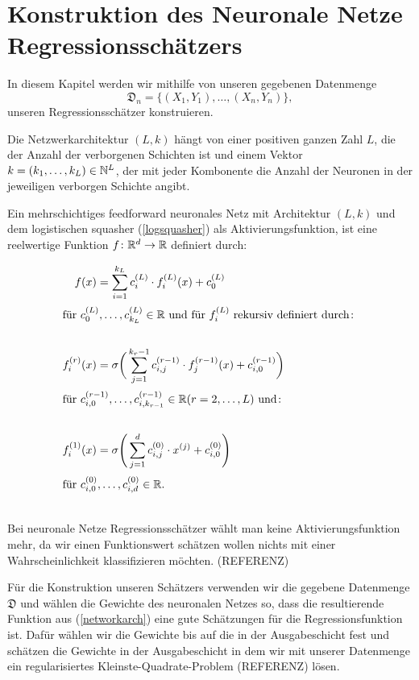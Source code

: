\chapter{Konstruktion des Neuronale Netze Regressionsschätzers}
\label{chap:2}

In diesem Kapitel werden wir mithilfe von unseren gegebenen Datenmenge 
$$ \mathfrak{D}_n = \{(X_1, Y_1),\dots,(X_n, Y_n)\},$$
unseren Regressionsschätzer konstruieren. 

Die Netzwerkarchitektur $(L, k)$ hängt von einer positiven ganzen Zahl $L$, die der Anzahl der verborgenen Schichten ist und einem Vektor $k = (k_1,\dots,k_L) \in \mathbb{N}^L$, der mit jeder Kombonente die Anzahl der Neuronen in der jeweiligen verborgen Schichte angibt. 

Ein mehrschichtiges feedforward neuronales Netz mit Architektur $(L, k)$ und dem logistischen squasher (\ref{logsquasher}) als Aktivierungsfunktion, ist eine reelwertige Funktion $f\colon \mathbb{R}^d \to \mathbb{R}$ definiert durch$\colon$

\begin{align}
\label{networkarch}
f(x) & = \sum_{i = 1}^{k_L} c_i^{(L)} \cdot f_i^{(L)}(x) + c_0^{(L)} \nonumber \\
\intertext{für $c_0^{(L)},\dots,c_{k_L}^{(L)} \in \mathbb{R}$ und für $f_i^{(L)}$ rekursiv definiert durch$\colon$} \nonumber \\
f_i^{(r)}(x) & = \sigma \bigg(\sum_{j = 1}^{k_r - 1} c_{i,j}^{(r - 1)} \cdot f_j^{(r - 1)}(x) + c_{i,0}^{(r - 1)} \bigg) \nonumber \\
\intertext{für $c_{i,0}^{(r - 1)},\dots,c_{i,k_{r - 1}}^{(r - 1)} \in \mathbb{R} (r = 2,\dots, L)$ und$\colon$} \\
f_i^{(1)}(x) & = \sigma \Bigg(\sum_{j = 1}^{d} c_{i,j}^{(0)} \cdot x^{(j)} + c_{i,0}^{(0)} \Bigg) \nonumber \\
\intertext{für $c_{i,0}^{(0)},\dots,c_{i,d}^{(0)} \in \mathbb{R}$.} \nonumber
\end{align} 
Bei neuronale Netze Regressionsschätzer wählt man keine Aktivierungsfunktion mehr, da wir einen Funktionswert schätzen wollen nichts mit einer Wahrscheinlichkeit klassifizieren möchten. (REFERENZ)

Für die Konstruktion unseren Schätzers verwenden wir die gegebene Datenmenge $\mathfrak{D}$ und wählen die Gewichte des neuronalen Netzes so, dass die resultierende Funktion aus (\ref{networkarch}) eine gute Schätzungen für die Regressionsfunktion ist. Dafür wählen wir die Gewichte bis auf die in der Ausgabeschicht fest und schätzen die Gewichte in der Ausgabeschicht in dem wir mit unserer Datenmenge ein regularisiertes Kleinste-Quadrate-Problem (REFERENZ) lösen.

